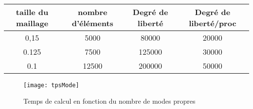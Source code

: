 \begin{center}
\begin{tabular}{c|c|c|c}
taille du maillage & nombre d'éléments & Degré de liberté & Degré de liberté/proc\\ \hline
0,15 & 5000 & 80000 & 20000\\ \hline
0.125 & 7500 & 125000 & 30000\\ \hline
0.1 & 12500 & 200000 & 50000
\end{tabular}
\end{center}

\begin{figure}[H]
\centering
\texttt{[image: tpsMode]}
\caption{Temps de calcul en fonction du nombre de modes propres}
\label{tpsMode}
\end{figure}



